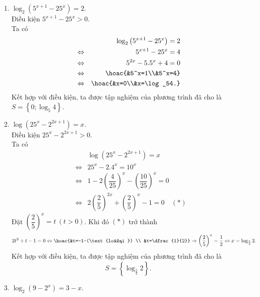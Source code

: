 \begin{ex}
{\begin{enumerate}
\begin{eqnarray*}
				&\Leftrightarrow&  x^2-2x+64=25-10x+x^2
				\\ 
				&\Leftrightarrow& 8x=-39 
				 \\
				&\Leftrightarrow&  x=-\dfrac{39}{8}.
			\end{eqnarray*}
			Kết hợp với điều kiện, ta được tập nghiệm của phương trình  đã cho là $S=\left\{-\dfrac{39}{8}\right\}$.
			 \item $\log_2\left(5^{x+1}-25^x\right)=2$.\\
			Điều kiện $5^{x+1}-25^x > 0$.\\ 
			 Ta có
			 \allowdisplaybreaks
			\begin{eqnarray*}
				 &&\log_2\left(5^{x+1}-25^x\right)=2
				\\ 
				&\Leftrightarrow& 5^{x+1}-25^x=4 
				 \\
				&\Leftrightarrow& 5^{2x}-5.5^x+4=0 
				 \\
				 &\Leftrightarrow&\hoac{&5^x=1\\&5^x=4}
				\\ 
				&\Leftrightarrow&\hoac{&x=0\\&x=\log_54.} 
			\end{eqnarray*}
			Kết hợp với điều kiện, ta được tập nghiệm  của phương trình đã cho là $S=\left\{0; \log_5 4\right\}$.
			 \item $\log \left(25^x-2^{2x+1}\right)=x$.\\
			 Điều kiện $25^x-2^{2x+1} > 0$.\\
			Ta có 
			\allowdisplaybreaks 
			\begin{eqnarray*}
				&&\log \left(25^x-2^{2x+1}\right)=x 
				\\ 
				&\Leftrightarrow& 25^x-2.4^x=10^x 
				 \\
				 & \Leftrightarrow& 1-2\left(\dfrac{4}{25}\right)^x-\left(\dfrac{10}{25}\right)^x=0
				\\ 
				 &\Leftrightarrow& 2\left(\dfrac{2}{5}\right)^{2x}+\left(\dfrac{2}{5}\right)^x-1=0\quad(*)
			\end{eqnarray*}
			Đặt $\left(\dfrac{2}{5}\right)^x=t~(t > 0)$. Khi đó $(*)$ trở thành \[2t^2+t-1=0\Leftrightarrow\hoac{&t=-1~(\text{loại  }) \\
			&t=\dfrac{1}{2}}  \Rightarrow\left(\dfrac{2}{5}\right)^x=\dfrac{1}{2} \Leftrightarrow x=\log _{\frac{5}{2}} 2.\]
			Kết hợp với điều kiện, ta được  tập nghiệm của phương trình đã cho là \[S=\left\{\log _{\frac{5}{2}} 2\right\}.\]
			\item $\log_2\left(9-2^x\right)=3-x$.\\ 

\end{enumerate}}
\end{ex}
